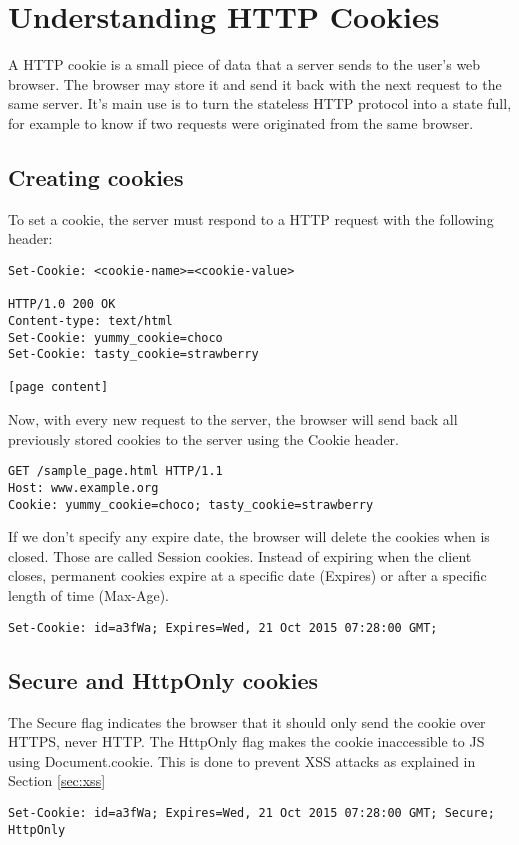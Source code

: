 \section{Understanding HTTP Cookies}
A HTTP cookie is a small piece of data that a server sends to the user's web browser. The browser may store it and send it back with the next request to the same server. It's main use is to turn the stateless HTTP protocol into a state full, for example to know if two requests were originated from the same browser. 

\subsection{Creating cookies}
To set a cookie, the server must respond to a HTTP request with the following header:
\begin{lstlisting}[style=verbs]
Set-Cookie: <cookie-name>=<cookie-value>

HTTP/1.0 200 OK
Content-type: text/html
Set-Cookie: yummy_cookie=choco
Set-Cookie: tasty_cookie=strawberry

[page content]
\end{lstlisting}
Now, with every new request to the server, the browser will send back all previously stored cookies to the server using the Cookie header.

\begin{lstlisting}[style=verbs]
GET /sample_page.html HTTP/1.1
Host: www.example.org
Cookie: yummy_cookie=choco; tasty_cookie=strawberry
\end{lstlisting}
If we don't specify any expire date, the browser will delete the cookies when is closed. Those are called Session cookies. Instead of expiring when the client closes, permanent cookies expire at a specific date (Expires) or after a specific length of time (Max-Age).
\begin{lstlisting}[style=verbs]
Set-Cookie: id=a3fWa; Expires=Wed, 21 Oct 2015 07:28:00 GMT;
\end{lstlisting}

\subsection{Secure and HttpOnly cookies}
The Secure flag indicates the browser that it should only send the cookie over HTTPS, never HTTP. The HttpOnly flag makes the cookie inaccessible to JS using Document.cookie. This is done to prevent XSS attacks as explained in Section \ref{sec:xss}
\begin{lstlisting}[style=verbs]
Set-Cookie: id=a3fWa; Expires=Wed, 21 Oct 2015 07:28:00 GMT; Secure; HttpOnly
\end{lstlisting}

